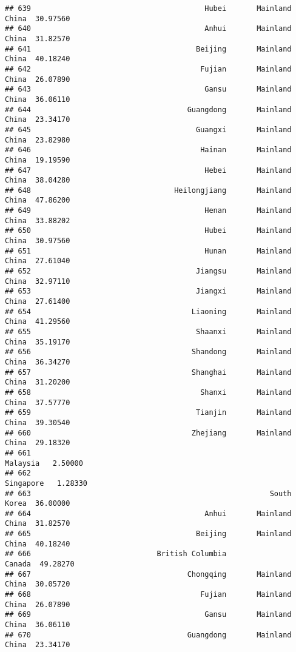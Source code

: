 \documentclass[
]{article}
\begin{document}
\begin{verbatim}
## 639                                        Hubei       Mainland China  30.97560
## 640                                        Anhui       Mainland China  31.82570
## 641                                      Beijing       Mainland China  40.18240
## 642                                       Fujian       Mainland China  26.07890
## 643                                        Gansu       Mainland China  36.06110
## 644                                    Guangdong       Mainland China  23.34170
## 645                                      Guangxi       Mainland China  23.82980
## 646                                       Hainan       Mainland China  19.19590
## 647                                        Hebei       Mainland China  38.04280
## 648                                 Heilongjiang       Mainland China  47.86200
## 649                                        Henan       Mainland China  33.88202
## 650                                        Hubei       Mainland China  30.97560
## 651                                        Hunan       Mainland China  27.61040
## 652                                      Jiangsu       Mainland China  32.97110
## 653                                      Jiangxi       Mainland China  27.61400
## 654                                     Liaoning       Mainland China  41.29560
## 655                                      Shaanxi       Mainland China  35.19170
## 656                                     Shandong       Mainland China  36.34270
## 657                                     Shanghai       Mainland China  31.20200
## 658                                       Shanxi       Mainland China  37.57770
## 659                                      Tianjin       Mainland China  39.30540
## 660                                     Zhejiang       Mainland China  29.18320
## 661                                                          Malaysia   2.50000
## 662                                                         Singapore   1.28330
## 663                                                       South Korea  36.00000
## 664                                        Anhui       Mainland China  31.82570
## 665                                      Beijing       Mainland China  40.18240
## 666                             British Columbia               Canada  49.28270
## 667                                    Chongqing       Mainland China  30.05720
## 668                                       Fujian       Mainland China  26.07890
## 669                                        Gansu       Mainland China  36.06110
## 670                                    Guangdong       Mainland China  23.34170

\end{verbatim}
\end{document}
